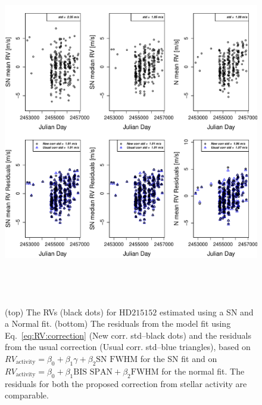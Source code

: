 \documentclass{aa}
\begin{document}
\begin{figure} 
\begin{center}
\includegraphics[height = 6in]{NEW_CORRECTIONHD21515_[3]CorrectionActivity_RadialVelocity_vs_time.pdf} 
   \caption{(top) The RVs (black dots) for $\text{HD}215152$ estimated using a SN and a Normal fit.
 (bottom) The residuals from the model fit using Eq.~\ref{eq:RV:correction} (New corr. std--black dots) and the residuals from the usual correction (Usual corr. std--blue triangles), based on $RV_{\text{activity}}=\beta_0+\beta_1 \gamma + \beta_2 \text{SN FWHM}$ for the SN fit and on $RV_{\text{activity}}=\beta_0+\beta_1 \text{BIS SPAN} + \beta_2 \text{FWHM}$ for the normal fit. The residuals for both the proposed correction from stellar activity are comparable.}
   \label{fig:HD215152:correctionRV}
\end{center}
\end{figure}
\end{document}
